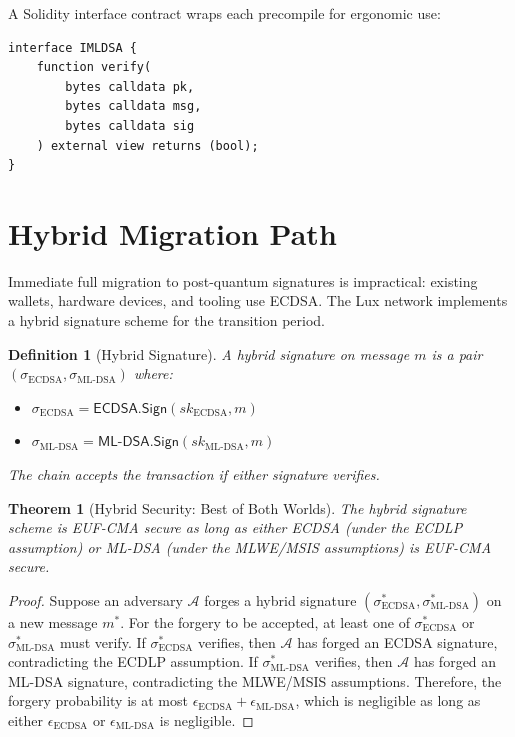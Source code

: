 \documentclass[11pt,a4paper]{article}
\newtheorem{theorem}{Theorem}[section]
\newtheorem{definition}{Definition}[section]
\begin{document}
A Solidity interface contract wraps each precompile for ergonomic use:

\begin{verbatim}
interface IMLDSA {
    function verify(
        bytes calldata pk,
        bytes calldata msg,
        bytes calldata sig
    ) external view returns (bool);
}
\end{verbatim}

\section{Hybrid Migration Path}
\label{sec:hybrid}

Immediate full migration to post-quantum signatures is impractical:
existing wallets, hardware devices, and tooling use ECDSA.  The Lux
network implements a hybrid signature scheme for the transition period.

\begin{definition}[Hybrid Signature]
A hybrid signature on message $m$ is a pair
$(\sigma_{\text{ECDSA}}, \sigma_{\text{ML-DSA}})$ where:
\begin{itemize}[nosep]
  \item $\sigma_{\text{ECDSA}} = \mathsf{ECDSA.Sign}(sk_{\text{ECDSA}}, m)$
  \item $\sigma_{\text{ML-DSA}} = \mathsf{ML\text{-}DSA.Sign}(sk_{\text{ML-DSA}}, m)$
\end{itemize}
The chain accepts the transaction if \emph{either} signature verifies.
\end{definition}

\begin{theorem}[Hybrid Security: Best of Both Worlds]
\label{thm:hybrid}
The hybrid signature scheme is EUF-CMA secure as long as either
ECDSA (under the ECDLP assumption) or ML-DSA (under the MLWE/MSIS
assumptions) is EUF-CMA secure.
\end{theorem}

\begin{proof}
Suppose an adversary $\mathcal{A}$ forges a hybrid signature
$(\sigma^*_{\text{ECDSA}}, \sigma^*_{\text{ML-DSA}})$ on a new message
$m^*$.  For the forgery to be accepted, at least one of
$\sigma^*_{\text{ECDSA}}$ or $\sigma^*_{\text{ML-DSA}}$ must verify.
If $\sigma^*_{\text{ECDSA}}$ verifies, then $\mathcal{A}$ has forged an
ECDSA signature, contradicting the ECDLP assumption.  If
$\sigma^*_{\text{ML-DSA}}$ verifies, then $\mathcal{A}$ has forged an
ML-DSA signature, contradicting the MLWE/MSIS assumptions.  Therefore,
the forgery probability is at most
$\epsilon_{\text{ECDSA}} + \epsilon_{\text{ML-DSA}}$, which is
negligible as long as either $\epsilon_{\text{ECDSA}}$ or
$\epsilon_{\text{ML-DSA}}$ is negligible.
\end{proof}
\end{document}
